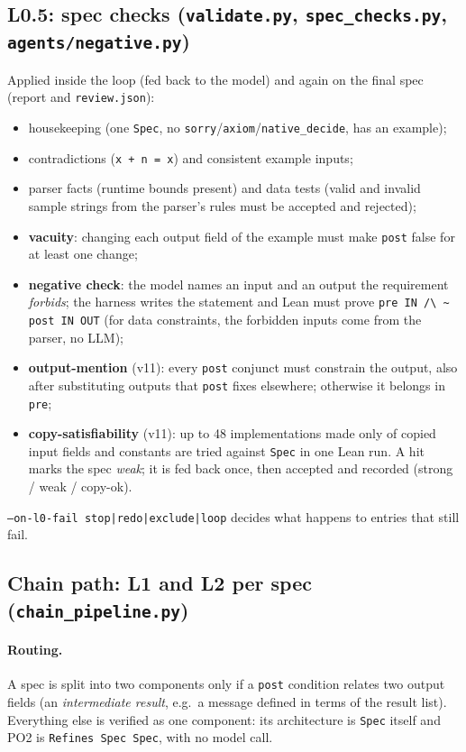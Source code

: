 \documentclass[11pt,a4paper]{article}
\newcommand{\code}[1]{\texttt{#1}}
\newcommand{\file}[1]{\texttt{#1}}
\begin{document}
\subsection{L0.5: spec checks (\file{validate.py}, \file{spec\_checks.py}, \file{agents/negative.py})}
Applied inside the loop (fed back to the model) and again on the final spec (report and
\file{review.json}):
\begin{itemize}
  \item housekeeping (one \code{Spec}, no \code{sorry}/\code{axiom}/\code{native\_decide}, has an example);
  \item contradictions (\code{x + n = x}) and consistent example inputs;
  \item parser facts (runtime bounds present) and data tests (valid and invalid sample strings
        from the parser's rules must be accepted and rejected);
  \item \textbf{vacuity}: changing each output field of the example must make \code{post} false
        for at least one change;
  \item \textbf{negative check}: the model names an input and an output the requirement
        \emph{forbids}; the harness writes the statement and Lean must prove
        \code{pre IN /\textbackslash{} \textasciitilde{} post IN OUT} (for data constraints, the
        forbidden inputs come from the parser, no LLM);
  \item \textbf{output-mention} (v11): every \code{post} conjunct must constrain the output, also
        after substituting outputs that \code{post} fixes elsewhere; otherwise it belongs in \code{pre};
  \item \textbf{copy-satisfiability} (v11): up to 48 implementations made only of copied input
        fields and constants are tried against \code{Spec} in one Lean run. A hit marks the spec
        \emph{weak}; it is fed back once, then accepted and recorded (strong / weak / copy-ok).
\end{itemize}
\code{--on-l0-fail stop|redo|exclude|loop} decides what happens to entries that still fail.

\subsection{Chain path: L1 and L2 per spec (\file{chain\_pipeline.py})}

\paragraph{Routing.} A spec is split into two components only if a \code{post} condition
relates two output fields (an \emph{intermediate result}, e.g.\ a message defined in terms of
the result list). Everything else is verified as one component: its architecture is
\code{Spec} itself and PO2 is \code{Refines Spec Spec}, with no model call.
\end{document}
